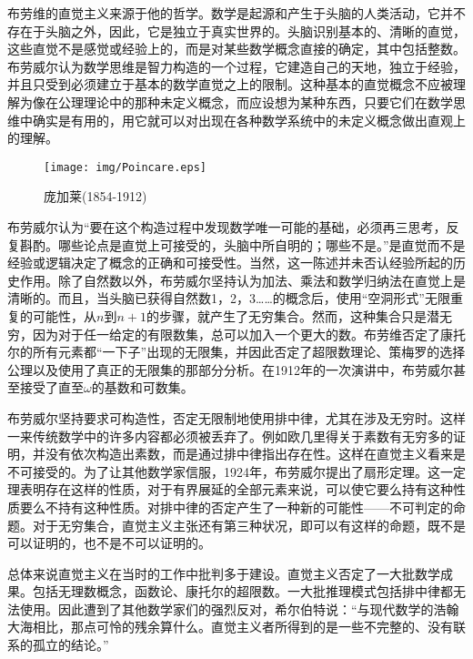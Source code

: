 \documentclass{article}
\begin{document}
布劳维的直觉主义来源于他的哲学。数学是起源和产生于头脑的人类活动，它并不存在于头脑之外，因此，它是独立于真实世界的。头脑识别基本的、清晰的直觉，这些直觉不是感觉或经验上的，而是对某些数学概念直接的确定，其中包括整数。布劳威尔认为数学思维是智力构造的一个过程，它建造自己的天地，独立于经验，并且只受到必须建立于基本的数学直觉之上的限制。这种基本的直觉概念不应被理解为像在公理理论中的那种未定义概念，而应设想为某种东西，只要它们在数学思维中确实是有用的，用它就可以对出现在各种数学系统中的未定义概念做出直观上的理解。

\begin{wrapfigure}{R}{0.3\textwidth}
 \centering
 \texttt{[image: img/Poincare.eps]}
 \captionsetup{labelformat=empty}
 \caption{庞加莱(1854-1912)}
 \label{fig:Poincare}
\end{wrapfigure}

布劳威尔认为“要在这个构造过程中发现数学唯一可能的基础，必须再三思考，反复斟酌。哪些论点是直觉上可接受的，头脑中所自明的；哪些不是。”是直觉而不是经验或逻辑决定了概念的正确和可接受性。当然，这一陈述并未否认经验所起的历史作用。除了自然数以外，布劳威尔坚持认为加法、乘法和数学归纳法在直觉上是清晰的。而且，当头脑已获得自然数1，2，3……的概念后，使用“空洞形式”无限重复的可能性，从$n$到$n+1$的步骤，就产生了无穷集合。然而，这种集合只是潜无穷，因为对于任一给定的有限数集，总可以加入一个更大的数。布劳维否定了康托尔的所有元素都“一下子”出现的无限集，并因此否定了超限数理论、策梅罗的选择公理以及使用了真正的无限集的那部分分析。在1912年的一次演讲中，布劳威尔甚至接受了直至$\omega$的基数和可数集。

布劳威尔坚持要求可构造性，否定无限制地使用排中律，尤其在涉及无穷时。这样一来传统数学中的许多内容都必须被丢弃了。例如欧几里得关于素数有无穷多的证明，并没有依次构造出素数，而是通过排中律指出存在性。这样在直觉主义看来是不可接受的。为了让其他数学家信服，1924年，布劳威尔提出了扇形定理。这一定理表明存在这样的性质，对于有界展延的全部元素来说，可以使它要么持有这种性质要么不持有这种性质。对排中律的否定产生了一种新的可能性——不可判定的命题。对于无穷集合，直觉主义主张还有第三种状况，即可以有这样的命题，既不是可以证明的，也不是不可以证明的。

总体来说直觉主义在当时的工作中批判多于建设。直觉主义否定了一大批数学成果。包括无理数概念，函数论、康托尔的超限数。一大批推理模式包括排中律都无法使用。因此遭到了其他数学家们的强烈反对，希尔伯特说：“与现代数学的浩翰大海相比，那点可怜的残余算什么。直觉主义者所得到的是一些不完整的、没有联系的孤立的结论。”

\end{document}
